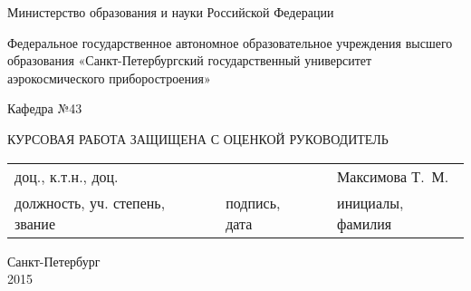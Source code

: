 \documentclass[a4paper,12pt]{article} %
\begin{document}
\begin{titlepage}

\begin{center}
	Министерство образования и науки Российской Федерации 

    Федеральное государственное автономное образовательное 
    учреждения высшего образования
    «Санкт-Петербургский государственный университет аэрокосмического приборостроения»

    \vspace{1cm}
	Кафедра №43
\end{center} 

\begin{flushleft}
    \vspace{2cm}
	КУРСОВАЯ РАБОТА\newline
	ЗАЩИЩЕНА С ОЦЕНКОЙ\newline
	РУКОВОДИТЕЛЬ\newline
\end{flushleft}

\begin{tabular}{p{4.5cm} p{0.5cm} p{4cm} p{0.5cm} p{4cm}}
    \centering доц., к.т.н., доц. & & & & {\hspace{0.3cm} Максимова Т.~М.} \\ \cline{1-1} \cline{3-3} \cline{5-5}  
    \centering \tiny{должность, уч. степень, звание} & & 
    \centering \tiny{подпись, дата} & & 
    \centering \tiny{инициалы, фамилия}
\end{tabular}


\vspace{\fill}
\begin{center}
Санкт-Петербург \\2015
\end{center}

\end{titlepage}

\newpage

\tableofcontents %
\end{document}
